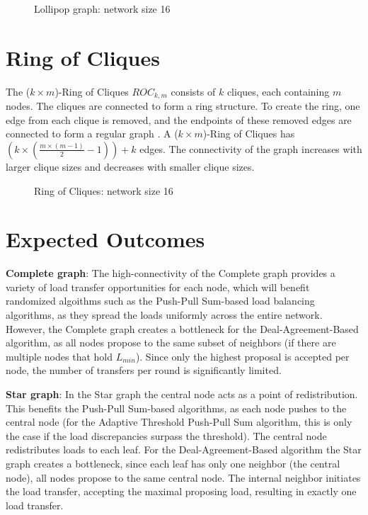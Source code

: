 \begin{figure}[H]
    \centering
    \scalebox{1}{}
    \caption{Lollipop graph: network size 16}
    \label{fig:lollipopgraphDemo}
\end{figure}

\section{Ring of Cliques}\label{sec:2ringofcliquegraph}
The ($k \times m$)-Ring of Cliques $ROC_{k,m}$ consists of $k$ cliques, each containing $m$ nodes. The cliques are connected to form a ring structure. To create the ring, one edge from each clique is removed, and the endpoints of these removed edges are connected to form a regular graph \cite{Mahlmann2010}. A ($k \times m$)-Ring of Cliques has $\left( k\times \left(\frac{m\times (m - 1)}{2}-1 \right) \right)+k$ edges. The connectivity of the graph increases with larger clique sizes and decreases with smaller clique sizes.

\begin{figure}[H]
    \centering
    \scalebox{1}{}
    \caption{Ring of Cliques: network size 16}
    \label{fig:ringofcliquesDemo}
\end{figure}

\section{Expected Outcomes}\label{sec:expectedoutcome}
\textbf{Complete graph}: The high-connectivity of the Complete graph provides a variety of load transfer opportunities for each node, which will benefit randomized algoithms such as the Push-Pull Sum-based load balancing algorithms, as they spread the loads uniformly across the entire network. However, the Complete graph creates a bottleneck for the Deal-Agreement-Based algorithm, as all nodes propose to the same subset of neighbors (if there are multiple nodes that hold $L_{min}$). Since only the highest proposal is accepted per node, the number of transfers per round is significantly limited.

\textbf{Star graph}: In the Star graph the central node acts as a point of redistribution. This benefits the Push-Pull Sum-based algorithms, as each node pushes to the central node (for the Adaptive Threshold Push-Pull Sum algorithm, this is only the case if the load discrepancies surpass the threshold). The central node redistributes loads to each leaf. For the Deal-Agreement-Based algorithm the Star graph creates a bottleneck, since each leaf has only one neighbor (the central node), all nodes propose to the same central node. The internal neighbor initiates the load transfer, accepting the maximal proposing load, resulting in exactly one load transfer.

